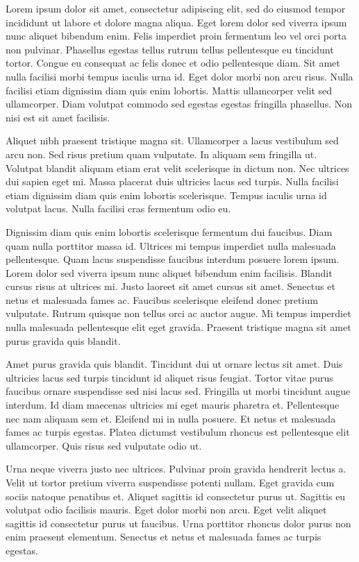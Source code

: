\documentclass[
]{tufte-pandoc}
\begin{document}
Lorem ipsum dolor sit amet, consectetur adipiscing elit, sed do eiusmod
tempor incididunt ut labore et dolore magna aliqua. Eget lorem dolor sed
viverra ipsum nunc aliquet bibendum enim. Felis imperdiet proin
fermentum leo vel orci porta non pulvinar. Phasellus egestas tellus
rutrum tellus pellentesque eu tincidunt tortor. Congue eu consequat ac
felis donec et odio pellentesque diam. Sit amet nulla facilisi morbi
tempus iaculis urna id. Eget dolor morbi non arcu risus. Nulla facilisi
etiam dignissim diam quis enim lobortis. Mattis ullamcorper velit sed
ullamcorper. Diam volutpat commodo sed egestas egestas fringilla
phasellus. Non nisi est sit amet facilisis.

Aliquet nibh praesent tristique magna sit. Ullamcorper a lacus
vestibulum sed arcu non. Sed risus pretium quam vulputate. In aliquam
sem fringilla ut. Volutpat blandit aliquam etiam erat velit scelerisque
in dictum non. Nec ultrices dui sapien eget mi. Massa placerat duis
ultricies lacus sed turpis. Nulla facilisi etiam dignissim diam quis
enim lobortis scelerisque. Tempus iaculis urna id volutpat lacus. Nulla
facilisi cras fermentum odio eu.

Dignissim diam quis enim lobortis scelerisque fermentum dui faucibus.
Diam quam nulla porttitor massa id. Ultrices mi tempus imperdiet nulla
malesuada pellentesque. Quam lacus suspendisse faucibus interdum posuere
lorem ipsum. Lorem dolor sed viverra ipsum nunc aliquet bibendum enim
facilisis. Blandit cursus risus at ultrices mi. Justo laoreet sit amet
cursus sit amet. Senectus et netus et malesuada fames ac. Faucibus
scelerisque eleifend donec pretium vulputate. Rutrum quisque non tellus
orci ac auctor augue. Mi tempus imperdiet nulla malesuada pellentesque
elit eget gravida. Praesent tristique magna sit amet purus gravida quis
blandit.

Amet purus gravida quis blandit. Tincidunt dui ut ornare lectus sit
amet. Duis ultricies lacus sed turpis tincidunt id aliquet risus
feugiat. Tortor vitae purus faucibus ornare suspendisse sed nisi lacus
sed. Fringilla ut morbi tincidunt augue interdum. Id diam maecenas
ultricies mi eget mauris pharetra et. Pellentesque nec nam aliquam sem
et. Eleifend mi in nulla posuere. Et netus et malesuada fames ac turpis
egestas. Platea dictumst vestibulum rhoncus est pellentesque elit
ullamcorper. Quis risus sed vulputate odio ut.

Urna neque viverra justo nec ultrices. Pulvinar proin gravida hendrerit
lectus a. Velit ut tortor pretium viverra suspendisse potenti nullam.
Eget gravida cum sociis natoque penatibus et. Aliquet sagittis id
consectetur purus ut. Sagittis eu volutpat odio facilisis mauris. Eget
dolor morbi non arcu. Eget velit aliquet sagittis id consectetur purus
ut faucibus. Urna porttitor rhoncus dolor purus non enim praesent
elementum. Senectus et netus et malesuada fames ac turpis egestas.
\end{document}
